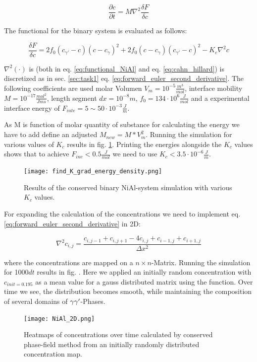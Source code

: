 \begin{equation}
	\frac{ \partial c}{ \partial t} = M \nabla^{2} \frac{\delta F}{\delta c} \label{eq:cahn_hillard}
\end{equation} 

The functional for the binary system is evaluated as follows:

\begin{equation}
	\frac{\delta F}{\delta c} = 2 f_{0}(c_{\gamma '} - c )(c - c_{\gamma})^2 + 2 f_{0} (c - c_{\gamma})(c_{\gamma '} - c )^{2} - K_{c} \nabla^{2} c  \label{eq:functional_NiAl}
\end{equation}
		
\(\nabla^{2}(\cdot)\) is (both in eq. \ref{eq:functional_NiAl} and eq. \ref{eq:cahn_hillard}) is discretized as in sec. \ref{sec:task1} eq. \ref{eq:forward_euler_second_derivative}.  The following coefficients are used molar Volumen \(V_{m} = 10^{-5} \frac{m^{3}}{mol}\), interface mobility \(M = 10^{-17} \frac{mol^{2}}{J m s}\), length segment \(dx = 10^{-8} m\), \(f_{0} = 134 \cdot 10^{6} \frac{J}{mol}\) and a experimental interface energy of \( F_{inte} = 5 \sim 50 \cdot 10^{-3} \frac{J}{m}\). 

As M is function of molar quantity of substance for calculating the energy we have to add define an adjusted \( M_{new} = M * V_{m}^{2}\). Running the simulation for various values of \(K_{c}\) results in fig. \ref{fig:vary_K}. Printing the energies alongside the \(K_{c}\) values shows that to achieve \(F_{ine} < 0.5 \frac{J}{mol}\) we need to use \(K_{c} < 3.5 \cdot 10^{-6} \frac{J}{m}\).

\begin{figure}[htb]
	\texttt{[image: find\_K\_grad\_energy\_density.png]} \label{fig:vary_K}
	\caption{Results of the conserved binary NiAl-system simulation with various \(K_{c}\) values.}
\end{figure}

For expanding the calculation of the concentrations we need to implement eq. \ref{eq:forward_euler_second_derivative} in 2D:

\begin{equation}
	\nabla^{2} c_{i,j} = \frac{c_{i,j-1} + c_{i,j+1} - 4c_{i, j} + c_{i-1, j} + c_{i+1, j}}{\Delta x^{2}} 
\end{equation}

where the concentrations are mapped on a \(n \times n\)-Matrix. Running the simulation for 1000\(dt\) results in fig.  . Here we applied an initially random concentration with \(c_{init = 0.195}\) as a mean value for a gauss distributed matrix using the  function. Over time we see, the distribution becomes smooth, while maintaining the composition of several domains of \(\gamma \\ \gamma '\)-Phases.

\begin{figure}
	\centering
	\texttt{[image: NiAl\_2D.png]} \label{fig:NiAl_2D_heatmaps}
	\caption{Heatmaps of concentrations over time calculated by conserved phase-field method from an initially randomly distributed concentration map.}
\end{figure}


\printbibliography





